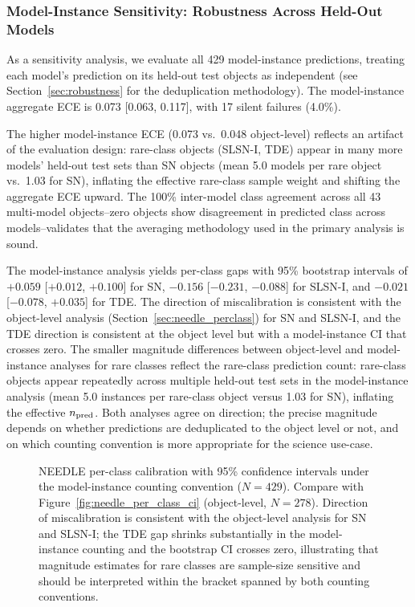 \documentclass[twocolumn]{aastex631}
\begin{document}
\subsubsection{Model-Instance Sensitivity: Robustness Across Held-Out Models} \label{sec:needle_sensitivity}

As a sensitivity analysis, we evaluate all 429 model-instance predictions, treating each model's prediction on its held-out test objects as independent (see Section~\ref{sec:robustness} for the deduplication methodology). The model-instance aggregate ECE is 0.073 [0.063, 0.117], with 17 silent failures (4.0\%).

The higher model-instance ECE (0.073 vs.\ 0.048 object-level) reflects an artifact of the evaluation design: rare-class objects (SLSN-I, TDE) appear in many more models' held-out test sets than SN objects (mean 5.0 models per rare object vs.\ 1.03 for SN), inflating the effective rare-class sample weight and shifting the aggregate ECE upward. The 100\% inter-model class agreement across all 43 multi-model objects--zero objects show disagreement in predicted class across models--validates that the averaging methodology used in the primary analysis is sound.

The model-instance analysis yields per-class gaps with 95\% bootstrap
intervals of $+0.059$ [$+0.012$, $+0.100$] for SN, $-0.156$ [$-0.231$,
$-0.088$] for SLSN-I, and $-0.021$ [$-0.078$, $+0.035$] for TDE. The
direction of miscalibration is consistent with the object-level analysis
(Section~\ref{sec:needle_perclass}) for SN and SLSN-I, and the TDE
direction is consistent at the object level but with a model-instance CI
that crosses zero. The smaller magnitude differences between object-level
and model-instance analyses for rare classes reflect the rare-class
prediction count: rare-class objects appear repeatedly across multiple
held-out test sets in the model-instance analysis (mean 5.0 instances
per rare-class object versus 1.03 for SN), inflating the effective
$n_{\rm pred}$. Both analyses agree on direction; the precise magnitude
depends on whether predictions are deduplicated to the object level or
not, and on which counting convention is more appropriate for the
science use-case.

\begin{figure}[t]
\caption{NEEDLE per-class calibration with 95\% confidence intervals
under the model-instance counting convention ($N = 429$). Compare with
Figure~\ref{fig:needle_per_class_ci} (object-level, $N = 278$).
Direction of miscalibration is consistent with the object-level
analysis for SN and SLSN-I; the TDE gap shrinks substantially in the
model-instance counting and the bootstrap CI crosses zero, illustrating
that magnitude estimates for rare classes are sample-size sensitive
and should be interpreted within the bracket spanned by both
counting conventions. \label{fig:needle_per_class_ci_mi}}
\end{figure}
\end{document}
